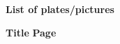 \begin{titlepage}

    \begin{center}
        {\fontsize{14}{18}\selectfont \textbf{List of plates/pictures}}
    \end{center}

    \vspace*{48pt} 

    \noindent
    {\fontsize{12}{14}\selectfont \textbf{Title}} \hfill {\fontsize{12}{14}\selectfont \textbf{Page}} \\[12pt] %

    {\fontsize{12}{18}\selectfont
    \makeatletter
    \newcommand{\cftplatelineleader}{\cftdotfill{\cftdotsep}}
    \renewcommand{\@pnumwidth}{1.55em}
    \renewcommand{\@tocrmarg}{2.55em}
    
    \makeatother
    }

\end{titlepage}


